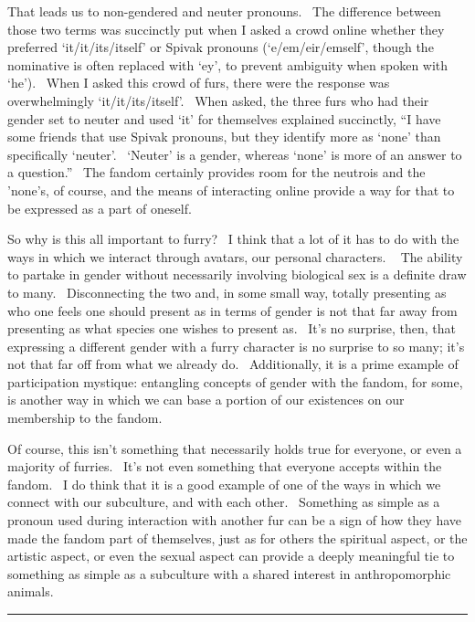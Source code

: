 That leads us to non-gendered and neuter pronouns. ~The difference
between those two terms was succinctly put when I asked a crowd online
whether they preferred `it/it/its/itself' or Spivak pronouns
(`e/em/eir/emself', though the nominative is often replaced with `ey',
to prevent ambiguity when spoken with `he'). ~When I asked this crowd of
furs, there were the response was overwhelmingly `it/it/its/itself'.
~When asked, the three furs who had their gender set to neuter and used
`it' for themselves explained succinctly, ``I have some friends that use
Spivak pronouns, but they identify more as `none' than specifically
`neuter'. ~`Neuter' is a gender, whereas `none' is more of an answer to
a question.'' ~The fandom certainly provides room for the neutrois and
the 'none's, of course, and the means of interacting online provide a
way for that to be expressed as a part of oneself.

So why is this all important to furry? ~I think that a lot of it has to
do with the ways in which we interact through avatars, our personal
characters. ~ The ability to partake in gender without necessarily
involving biological sex is a definite draw to many. ~Disconnecting the
two and, in some small way, totally presenting as who one feels one
should present as in terms of gender is not that far away from
presenting as what species one wishes to present as. ~It's no surprise,
then, that expressing a different gender with a furry character is no
surprise to so many; it's not that far off from what we already do.
~Additionally, it is a prime example of participation mystique:
entangling concepts of gender with the fandom, for some, is another way
in which we can base a portion of our existences on our membership to
the fandom.

Of course, this isn't something that necessarily holds true for
everyone, or even a majority of furries. ~It's not even something that
everyone accepts within the fandom. ~I do think that it is a good
example of one of the ways in which we connect with our subculture, and
with each other. ~Something as simple as a pronoun used during
interaction with another fur can be a sign of how they have made the
fandom part of themselves, just as for others the spiritual aspect, or
the artistic aspect, or even the sexual aspect can provide a deeply
meaningful tie to something as simple as a subculture with a shared
interest in anthropomorphic animals.

\begin{center}\rule{0.5\linewidth}{\linethickness}\end{center}

